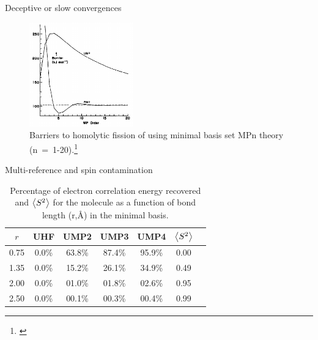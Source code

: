 \documentclass[xcolor=x11names,compress]{beamer}
\renewcommand{\(}{\begin{columns}}
\renewcommand{\)}{\end{columns}}
\newcommand{\<}[1]{\begin{column}{#1}}
\renewcommand{\>}{\end{column}}
\begin{document}
\begin{frame}{Deceptive or slow convergences}

\begin{figure}
    \centering
    \includegraphics[width=0.4\textwidth]{gill1986.png}
    \caption{\centering Barriers to homolytic fission of  using minimal basis set MPn theory (n~=~1-20).\footnote{\cite{gill_deceptive_1986}}}
    \label{fig:my_label}
\end{figure}

    
\end{frame}

\begin{frame}{Multi-reference and spin contamination}
\begin{table}
    \centering
    \begin{tabular}{c c c c c c c}
\hline
 $r$ & UHF & UMP2 & UMP3 & UMP4 & $\expval{S^2}$ \\
\hline
0.75 & 0.0\% & 63.8\% & 87.4\% & 95.9\% & 0.00\\
1.35 & 0.0\% & 15.2\% & 26.1\% & 34.9\% & 0.49\\
2.00 & 0.0\% & 01.0\% & 01.8\% & 02.6\% & 0.95\\
2.50 & 0.0\% & 00.1\% & 00.3\% & 00.4\% & 0.99\\
\hline
\end{tabular}
    \caption{\centering Percentage of electron correlation energy recovered and $\expval{S^2}$ for the  molecule as a function of bond length (r,\si{\angstrom}) in the minimal basis.}
    \label{tab:my_label}
\end{table}

    
\end{frame}
\end{document}
